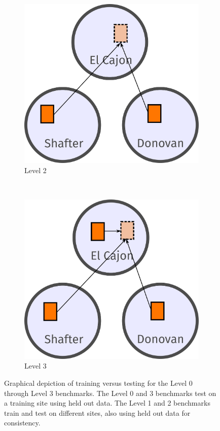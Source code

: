 \documentclass[journal abbreviation, manuscript]{copernicus}
\begin{document}
\begin{figure}
~
\begin{subfigure}{0.23\textwidth}
\includegraphics[width=\textwidth]{writeup/img/level2.png}
\caption{Level 2}
\end{subfigure}
~
\begin{subfigure}{0.23\textwidth}
\includegraphics[width=\textwidth]{writeup/img/level3.png}
\caption{Level 3}
\end{subfigure}
\caption{Graphical depiction of training versus testing for the Level 0 through Level 3 benchmarks.  The Level 0 and 3 benchmarks test on a training site using held out data.  The Level 1 and 2 benchmarks train and test on different sites, also using held out data for consistency.}
\end{figure}
\end{document}
